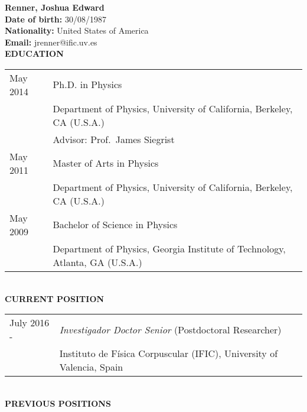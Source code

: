 \textbf{Renner, Joshua Edward}\\
\textbf{Date of birth:} 30/08/1987\\
\textbf{Nationality:} United States of America\\
\textbf{Email:} jrenner@ific.uv.es\\

%

{\noindent\textbf{EDUCATION}}\\

\begin{tabular}{ll}
May 2014 & Ph.D. in Physics\\
& Department of Physics, University of California, Berkeley, CA (U.S.A.)\\
& Advisor: Prof.\ James Siegrist\\

May 2011 & Master of Arts in Physics\\
& Department of Physics, University of California, Berkeley, CA (U.S.A.)\\

May 2009 & Bachelor of Science in Physics\\
& Department of Physics, Georgia Institute of Technology, Atlanta, GA (U.S.A.)\\
\end{tabular}\\

{\noindent\textbf{CURRENT POSITION}}\\

\begin{tabular}{ll}
	July 2016 - & \emph{Investigador Doctor Senior} (Postdoctoral Researcher)\\
	& Instituto de F\'{i}sica Corpuscular (IFIC), University of Valencia, Spain\\
\end{tabular}\\

{\noindent\textbf{PREVIOUS POSITIONS}}\\

